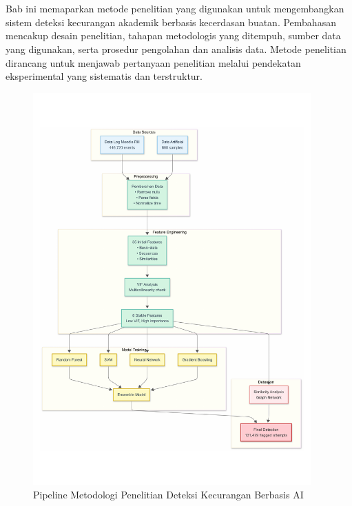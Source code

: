 \chapter{\babTiga}
\label{bab:3}
Bab ini memaparkan metode penelitian yang digunakan untuk mengembangkan sistem deteksi kecurangan akademik berbasis kecerdasan buatan. Pembahasan mencakup desain penelitian, tahapan metodologis yang ditempuh, sumber data yang digunakan, serta prosedur pengolahan dan analisis data. Metode penelitian dirancang untuk menjawab pertanyaan penelitian melalui pendekatan eksperimental yang sistematis dan terstruktur.

\begin{figure}[htbp]
    \centering
    \includegraphics[width=0.95\textwidth]{figures/pipeline_overview.pdf}
    \caption{Pipeline Metodologi Penelitian Deteksi Kecurangan Berbasis AI}
    \label{fig:pipeline_overview}
\end{figure}

